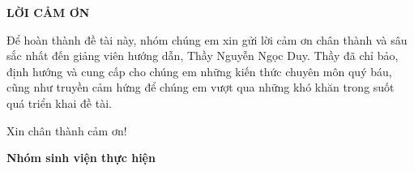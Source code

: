 \documentclass[../DoAn.tex]{subfiles}
\begin{document}
\begin{center}
  \Large{\textbf{LỜI CẢM ƠN}}\\
\end{center}
\vspace{1cm}
Để hoàn thành đề tài này, nhóm chúng em xin gửi lời cảm ơn chân thành và sâu sắc nhất đến giảng viên hướng dẫn, Thầy Nguyễn Ngọc Duy. Thầy đã chỉ bảo, định hướng và cung cấp cho chúng em những kiến thức chuyên môn quý báu, cũng như truyền cảm hứng để chúng em vượt qua những khó khăn trong suốt quá triển khai đề tài.

Xin chân thành cảm ơn!

\textbf{Nhóm sinh viện thực hiện}
\end{document}
